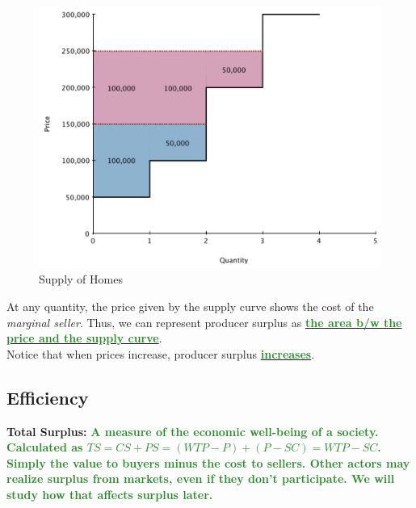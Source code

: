 \documentclass[11pt]{article}\usepackage[]{graphicx}\usepackage[]{color}
\theoremstyle{definition}
\newcommand{\ddp}[1]{{\textbf{\textcolor{ForestGreen}{#1}}}}
\newcommand{\dd}[1]{{\underline{\textbf{\textcolor{ForestGreen}{#1}}}}}
\newcommand{\defn}[1]{\textbf{#1}}
\begin{document}
	\begin{figure}[H]
		\centering
		\includegraphics[scale=.40]{plot20.pdf}
		\caption{Supply of Homes}
	\end{figure}
	
	At any quantity, the price given by the supply curve shows the cost of the \textit{marginal seller}. Thus, we can represent producer surplus as \dd{the area b/w the price and the supply curve}.
	\\
	
	Notice that when prices increase, producer surplus \dd{increases}.
	
	\subsection{Efficiency}
	
	\defn{Total Surplus:} \ddp{A measure of the economic well-being of a society. Calculated as $TS = CS + PS = (WTP - P) + (P - SC) = WTP - SC$. Simply the value to buyers minus the cost to sellers. Other actors may realize surplus from markets, even if they don't participate. We will study how that affects surplus later.}
\end{document}
